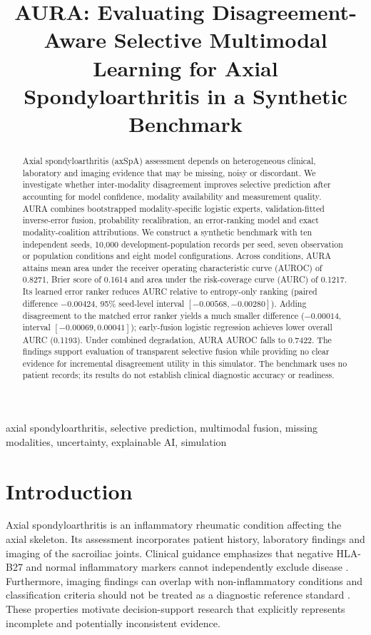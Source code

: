 \documentclass[conference]{IEEEtran}
\title{AURA: Evaluating Disagreement-Aware Selective Multimodal Learning for Axial Spondyloarthritis in a Synthetic Benchmark}
\author{\IEEEauthorblockN{Anonymous author(s)}\IEEEauthorblockA{Author details withheld for review}}
\begin{document}
\maketitle
\begin{abstract}
Axial spondyloarthritis (axSpA) assessment depends on heterogeneous clinical, laboratory and imaging evidence that may be missing, noisy or discordant. We investigate whether inter-modality disagreement improves selective prediction after accounting for model confidence, modality availability and measurement quality. AURA combines bootstrapped modality-specific logistic experts, validation-fitted inverse-error fusion, probability recalibration, an error-ranking model and exact modality-coalition attributions. We construct a synthetic benchmark with ten independent seeds, 10,000 development-population records per seed, seven observation or population conditions and eight model configurations. Across conditions, AURA attains mean area under the receiver operating characteristic curve (AUROC) of 0.8271, Brier score of 0.1614 and area under the risk-coverage curve (AURC) of 0.1217. Its learned error ranker reduces AURC relative to entropy-only ranking (paired difference $-0.00424$, 95\% seed-level interval $[-0.00568,-0.00280]$). Adding disagreement to the matched error ranker yields a much smaller difference ($-0.00014$, interval $[-0.00069,0.00041]$); early-fusion logistic regression achieves lower overall AURC (0.1193). Under combined degradation, AURA AUROC falls to 0.7422. The findings support evaluation of transparent selective fusion while providing no clear evidence for incremental disagreement utility in this simulator. The benchmark uses no patient records; its results do not establish clinical diagnostic accuracy or readiness.\end{abstract}
\begin{IEEEkeywords}
axial spondyloarthritis, selective prediction, multimodal fusion, missing modalities, uncertainty, explainable AI, simulation
\end{IEEEkeywords}
\section{Introduction}
Axial spondyloarthritis is an inflammatory rheumatic condition affecting the axial skeleton. Its assessment incorporates patient history, laboratory findings and imaging of the sacroiliac joints. Clinical guidance emphasizes that negative HLA-B27 and normal inflammatory markers cannot independently exclude disease \cite{nice}. Furthermore, imaging findings can overlap with non-inflammatory conditions and classification criteria should not be treated as a diagnostic reference standard \cite{mri,asas}. These properties motivate decision-support research that explicitly represents incomplete and potentially inconsistent evidence.
\end{document}
